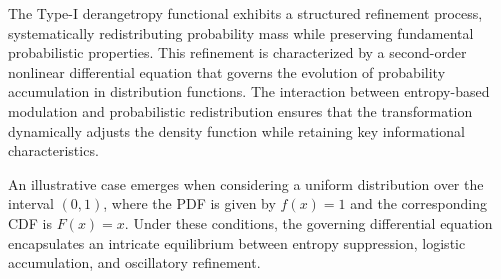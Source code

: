 \documentclass[sn-mathphys-num]{sn-jnl}%
\theoremstyle{thmstyleone}%
\theoremstyle{thmstyletwo}%
\theoremstyle{thmstylethree}%
\begin{document}
The Type-I derangetropy functional exhibits a structured refinement process, systematically redistributing probability mass while preserving fundamental probabilistic properties. This refinement is characterized by a second-order nonlinear differential equation that governs the evolution of probability accumulation in distribution functions. The interaction between entropy-based modulation and probabilistic redistribution ensures that the transformation dynamically adjusts the density function while retaining key informational characteristics.

An illustrative case emerges when considering a uniform distribution over the interval $(0,1)$, where the PDF is given by $f(x)=1$ and the corresponding CDF is $F(x)=x$. Under these conditions, the governing differential equation encapsulates an intricate equilibrium between entropy suppression, logistic accumulation, and oscillatory refinement. 
\end{document}
